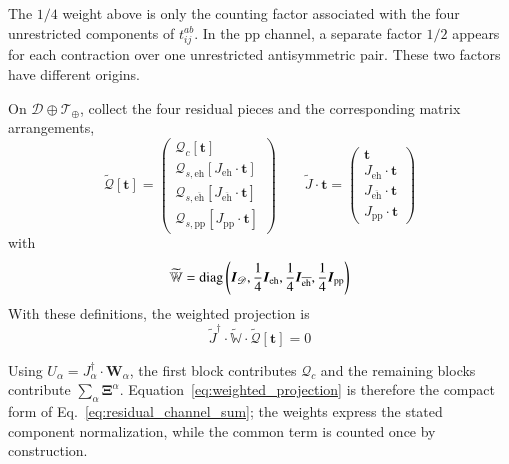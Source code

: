 \documentclass[aip,jcp,reprint,noshowkeys,superscriptaddress]{revtex4-1}
\newcommand{\eh}{\text{eh}}
\newcommand{\teh}{{\overline{\text{eh}}}}
\newcommand{\pp}{\text{pp}}
\newcommand{\bt}{\boldsymbol{t}}
\newcommand{\bI}{\boldsymbol{I}}
\newcommand{\bW}{\boldsymbol{W}}
\newcommand{\bXi}{\boldsymbol{\Xi}}
\newcommand{\bcalQ}{\boldsymbol{\mathcal{Q}}}
\begin{document}
The $1/4$ weight above is only the counting factor associated with the four
unrestricted components of $t_{ij}^{ab}$. In the $\pp$ channel, a separate
factor $1/2$ appears for each contraction over one unrestricted
antisymmetric pair. These two factors have different origins.

On $\mathscr D\oplus\mathscr T_{\oplus}$, collect the four residual pieces
and the corresponding matrix arrangements,
\begin{equation*}
    \widetilde{\boldsymbol{\mathcal Q}}[\bt]
    =
    \begin{pmatrix}
        \bcalQ_c[\bt]\\
        \bcalQ_{s,\eh}[J_{\eh}\cdot\bt]\\
        \bcalQ_{s,\teh}[J_{\teh}\cdot\bt]\\
        \bcalQ_{s,\pp}[J_{\pp}\cdot\bt]
    \end{pmatrix}
    \qquad
    \widetilde J\cdot\bt
    =
    \begin{pmatrix}
        \bt\\
        J_{\eh}\cdot\bt\\
        J_{\teh}\cdot\bt\\
        J_{\pp}\cdot\bt
    \end{pmatrix}
\end{equation*}
with
\begin{equation*}
    \widetilde{\mathbb W}
    =
    \operatorname{diag}
    \qty(
        \bI_{\mathscr D},
        \frac14\bI_{\eh},
        \frac14\bI_{\teh},
        \frac14\bI_{\pp}
    )
\end{equation*}
With these definitions, the weighted projection is
\begin{equation}
    \widetilde J^{\dagger}
    \cdot\widetilde{\mathbb W}
    \cdot\widetilde{\boldsymbol{\mathcal Q}}[\bt]
    =0
    \label{eq:weighted_projection}
\end{equation}

Using $U_{\alpha}=J_{\alpha}^{\dagger}\cdot\bW_{\alpha}$, the first block contributes
$\bcalQ_c$ and the remaining blocks contribute $\sum_{\alpha}\bXi^{\alpha}$.
Equation~\eqref{eq:weighted_projection} is therefore the compact form of
Eq.~\eqref{eq:residual_channel_sum}; the weights express the stated component
normalization, while the common term is counted once by construction.



\end{document}

